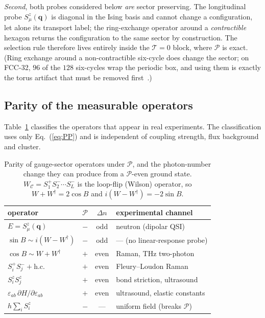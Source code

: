 \documentclass[aps,prl,preprint,amsmath,amssymb,superscriptaddress,
longbibliography,floatfix]{revtex4-2}
\DeclareRobustCommand{\bq}{\bm q}
\newcommand{\PP}{\mathcal{P}}
\begin{document}
\emph{Second}, both probes considered below \emph{are} sector preserving.  The
longitudinal probe $S^z_\mu(\bq)$ is diagonal in the Ising basis and cannot
change a configuration, let alone its transport label; the ring-exchange
operator around a \emph{contractible} hexagon returns the configuration to the
same sector by construction.  The selection rule therefore lives entirely
inside the $\mathcal T=0$ block, where $\PP$ is exact.  (Ring exchange around a
non-contractible six-cycle does change the sector; on FCC-32, $96$ of the $128$
six-cycles wrap the periodic box, and using them is exactly the torus artifact
that must be removed first~\cite{ZhouKimMask}.)

\subsection{Parity of the measurable operators}

Table~\ref{tab:parity} classifies the operators that appear in real
experiments.  The classification uses only Eq.~(\ref{eq:PP}) and is
independent of coupling strength, flux background and cluster.

\begin{table}[t]
\caption{Parity of gauge-sector operators under $\PP$, and the photon-number
change they can produce from a $\PP$-even ground state.  $W_{\mathcal C}
=S^+_1S^-_2\cdots S^-_L$ is the loop-flip (Wilson) operator, so
$W+W^\dagger=2\cos B$ and $i(W-W^\dagger)=-2\sin B$.}
\label{tab:parity}
\begin{ruledtabular}
\begin{tabular}{lccl}
operator & $\PP$ & $\Delta n$ & experimental channel\\ \hline
$E=S^z_\mu(\bq)$              & $-$ & odd  & neutron (dipolar QSI)\\
$\sin B \sim i(W-W^\dagger)$  & $-$ & odd  & --- (no linear-response probe)\\
$\cos B \sim W+W^\dagger$     & $+$ & even & Raman, THz two-photon\\
$S^+_iS^-_j+\mathrm{h.c.}$    & $+$ & even & Fleury--Loudon Raman~\cite{Fleury1968}\\
$S^z_iS^z_j$                  & $+$ & even & bond striction, ultrasound\\
$\varepsilon_{ab}\,\partial H/\partial\varepsilon_{ab}$ & $+$ & even & ultrasound, elastic constants\\
$h\sum_iS^z_i$                & $-$ & ---  & uniform field (breaks $\PP$)\\
\end{tabular}
\end{ruledtabular}
\end{table}
\end{document}
